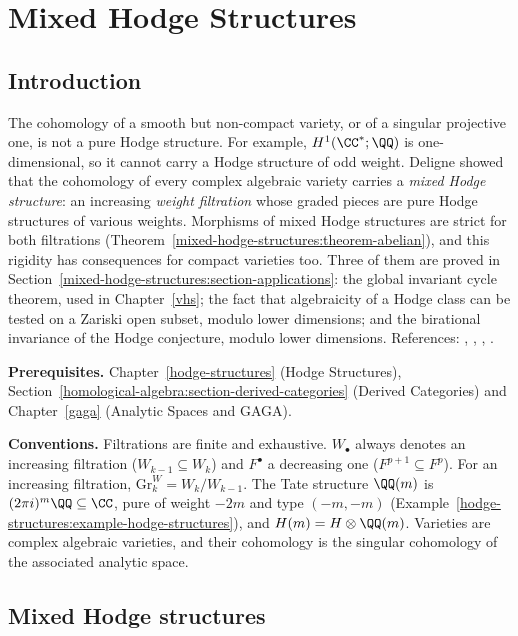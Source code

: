 \chapter{Mixed Hodge Structures}\label{mixed-hodge-structures}

\section{Introduction}\label{mixed-hodge-structures:section-introduction}

The cohomology of a smooth but non-compact variety, or of a singular projective one, is not a pure Hodge structure. For example, $H^1(\CC^*; \QQ)$ is one-dimensional, so it cannot carry a
Hodge structure of odd weight. Deligne showed that the cohomology of every complex algebraic variety carries a \emph{mixed Hodge structure}: an increasing \emph{weight filtration} whose graded pieces
are pure Hodge structures of various weights. Morphisms of mixed Hodge structures are strict for both filtrations (Theorem~\ref{mixed-hodge-structures:theorem-abelian}), and this rigidity has consequences
for compact varieties too. Three of them are proved in Section~\ref{mixed-hodge-structures:section-applications}: the global invariant cycle theorem, used in Chapter~\ref{vhs}; the fact that
algebraicity of a Hodge class can be tested on a Zariski open subset, modulo lower dimensions; and the birational invariance of the Hodge conjecture, modulo lower dimensions. References:
\cite{deligne-hodge-2}, \cite{deligne-hodge-3}, \cite{peters-steenbrink}, \cite[Chapter 8]{voisin-hodge-1}.

\noindent\textbf{Prerequisites.} Chapter~\ref{hodge-structures} (Hodge Structures), Section~\ref{homological-algebra:section-derived-categories} (Derived Categories) and Chapter~\ref{gaga} (Analytic Spaces and GAGA).

\noindent\textbf{Conventions.} Filtrations are finite and exhaustive. $W_\bullet$ always denotes an increasing filtration ($W_{k-1} \subseteq W_k$) and $F^\bullet$ a decreasing one
($F^{p+1} \subseteq F^p$). For an increasing filtration, $\mathrm{Gr}^W_k = W_k/W_{k-1}$. The Tate structure $\QQ(m)$ is $(2\pi i)^m\QQ \subseteq \CC$, pure of weight $-2m$ and type $(-m,-m)$
(Example~\ref{hodge-structures:example-hodge-structures}), and $H(m) = H \otimes \QQ(m)$. Varieties are complex algebraic varieties, and their cohomology is the singular cohomology of the associated
analytic space.

\section{Mixed Hodge structures}\label{mixed-hodge-structures:section-definition}

